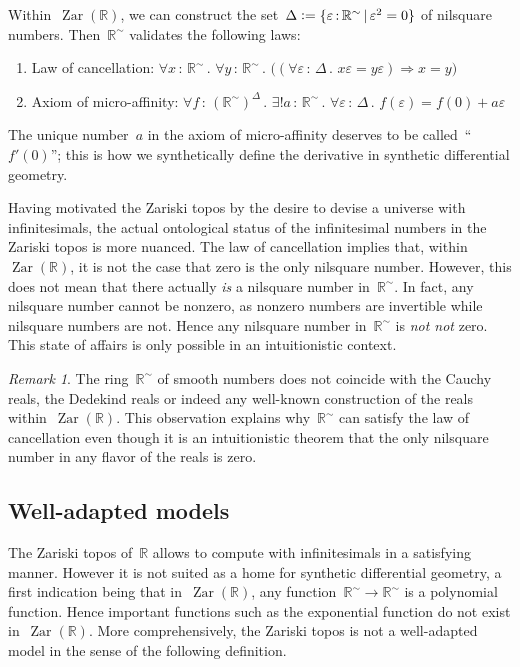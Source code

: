 \documentclass[oneside,reqno]{amsart}
\theoremstyle{definition}
\theoremstyle{plain}
\theoremstyle{remark}
\newtheorem{rem}[defn]{Remark}
\newcommand{\RR}{\mathbb{R}}
\newcommand{\defeq}{\vcentcolon=}
\DeclareMathOperator{\Zar}{Zar}
\renewcommand{\_}{\mathpunct{.}\,}
\newcommand{\?}{\,{:}\,}
\begin{document}
Within~$\Zar(\RR)$, we can construct the set~$\Delta \defeq \{ \varepsilon \? \RR^\sim \,|\,
\varepsilon^2 = 0 \}$ of nilsquare numbers. Then~$\RR^\sim$ validates the following laws:
\begin{enumerate}
\item Law of cancellation: $\forall x \? \RR^\sim\_ \forall y \? \RR^\sim\_ \bigl((\forall
\varepsilon \? \Delta\_ x\varepsilon = y\varepsilon)
\Rightarrow x = y\bigr)$
\item Axiom of micro-affinity: $\forall f \? (\RR^\sim)^\Delta\_ \exists! a \? \RR^\sim\_
\forall \varepsilon \? \Delta\_ f(\varepsilon) = f(0) + a\varepsilon$
\end{enumerate}
The unique number~$a$ in the axiom of micro-affinity deserves to be
called~``$f'(0)$''; this is how we synthetically define the derivative in
synthetic differential geometry.

Having motivated the Zariski topos by the desire to devise a universe with
infinitesimals, the actual ontological status of the infinitesimal numbers in
the Zariski topos is more nuanced. The law of cancellation implies that,
within~$\Zar(\RR)$, it is not the case that zero is the only nilsquare number.
However, this does not mean that there actually \emph{is} a nilsquare number
in~$\RR^\sim$. In fact, any nilsquare number cannot be nonzero, as nonzero numbers are
invertible while nilsquare numbers are not. Hence any nilsquare number in~$\RR^\sim$
is \emph{not not} zero. This state of affairs is only possible in an
intuitionistic context.

\begin{rem}The ring~$\RR^\sim$ of smooth numbers does not coincide with the Cauchy reals,
the Dedekind reals or indeed any well-known construction of the reals
within~$\Zar(\RR)$. This observation explains why~$\RR^\sim$ can satisfy the law of
cancellation even though it is an intuitionistic theorem that the only
nilsquare number in any flavor of the reals is zero.
\end{rem}


\subsection{Well-adapted models} The Zariski topos of~$\RR$ allows to compute with
infinitesimals in a satisfying manner. However it is not suited as a home for
synthetic differential geometry, a first indication being that in~$\Zar(\RR)$,
any function~$\RR^\sim \to \RR^\sim$ is a polynomial function. Hence important functions such as the
exponential function do not exist in~$\Zar(\RR)$. More comprehensively, the
Zariski topos is not a well-adapted model in the sense of the following
definition.
\end{document}
